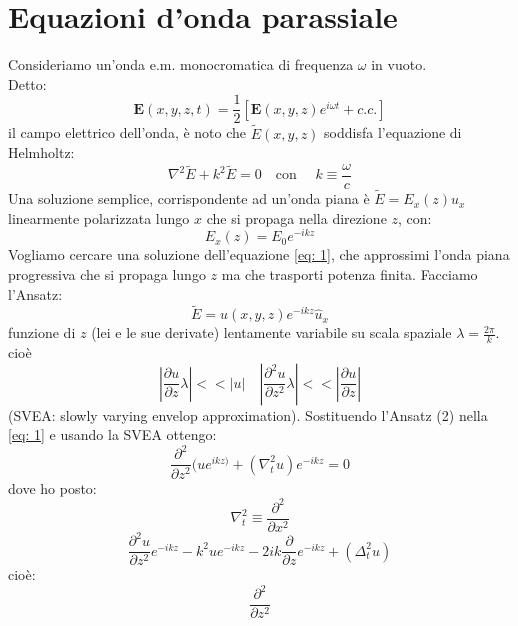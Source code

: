 \documentclass{book}
\def \*#1{\mathbf{#1}}
\def \w {\omega}
\theoremstyle{remark}
\begin{document}
\section{Equazioni d'onda parassiale}
Consideriamo un'onda e.m. monocromatica di frequenza $\w$ in vuoto.\\
Detto:
\begin{equation*}
\*E(x,y,z,t) = \frac{1}{2} \left[\*E(x,y,z) e^{i\omega t} + c.c.\right]
\end{equation*}
il campo elettrico dell'onda, è noto che $\widetilde{E}(x,y,z)$ soddisfa l'equazione di Helmholtz:
\begin{equation}\label{eq: 1}
\nabla^2 \widetilde{E} + k^2 \widetilde{E} = 0 \quad \text{con } \quad k \equiv \frac{\omega}{c}
\end{equation}
Una soluzione semplice, corrispondente ad un'onda piana è $\widetilde{E} = E_x(z)\hat{u}_x$ linearmente polarizzata lungo $x$ che si propaga nella direzione $z$, con:
\begin{equation*}
E_x(z) = E_0 e^{-ikz}
\end{equation*}
Vogliamo cercare una soluzione dell'equazione \eqref{eq: 1}, che approssimi l'onda piana progressiva che si propaga lungo $z$ ma che trasporti potenza finita. Facciamo l'Ansatz:
\begin{equation*}
\widetilde{E} = u(x,y,z) e^{-i k z} \hat{u}_x
\end{equation*}
funzione di $z$ (lei e le sue derivate) lentamente variabile su scala spaziale $\lambda = \frac{2\pi}{k}$.
cioè
\begin{equation*}
\left| \frac{\partial u}{\partial z} \lambda \right| << |u| \quad \left| \frac{\partial^2 u}{\partial z^2} \lambda \right| << \left|\frac{\partial u}{\partial z}\right|
\end{equation*}
(SVEA: slowly varying envelop approximation). Sostituendo l'Ansatz (2) nella \eqref{eq: 1} e usando la SVEA ottengo:
\begin{equation*}
\frac{\partial^2}{\partial z^2} (u e^{ikz)} + (\nabla_t^2 u) e^{-ikz} = 0
\end{equation*}
dove ho posto:
\begin{equation*}
\nabla_t^2 \equiv \frac{\partial^2}{\partial x^2}
\end{equation*}
\begin{equation*}
\frac{\partial^2 u}{\partial z^2} e^{-ikz} -k^2 u e^{-ikz} - 2ik \frac{\partial}{\partial z} e^{-ikz} + (\Delta_t^2 u) 
\end{equation*}
cioè:
\begin{equation*}
\frac{\partial^2}{\partial z^2}
\end{equation*}
\end{document}
